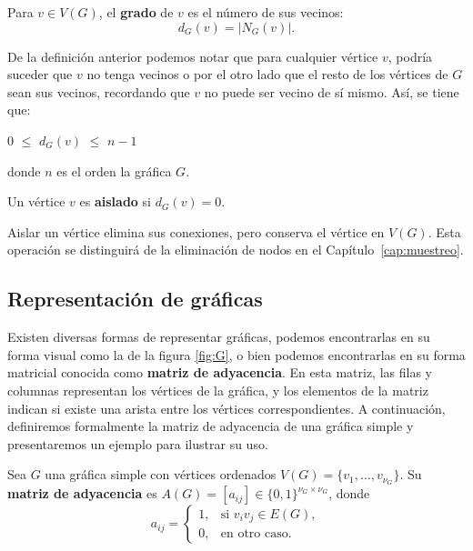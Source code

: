 \begin{definition}
\label{def:grado-vertice}
Para $v\in V(G)$, el \textbf{grado} de $v$ es el número de sus vecinos:
\[
d_G(v)=|N_G(v)|.
\]
\end{definition}

De la definición anterior podemos notar que para cualquier vértice $v$, podría suceder que $v$ no tenga vecinos o por el otro lado que el resto de los vértices de $G$ sean sus vecinos, recordando que $v$ no puede ser vecino de sí mismo. Así, se tiene que:
\begin{center}
        0 $\leq$ $d_G(v)$ $\leq$ $n-1$
    \end{center} 
    donde $n$ es el orden la gráfica $G$.

\begin{definition}
\label{def:vertice-aislado}
Un vértice $v$ es \textbf{aislado} si $d_G(v)=0$.
\end{definition}

Aislar un vértice elimina sus conexiones, pero conserva el vértice en $V(G)$. Esta operación se distinguirá de la eliminación de nodos en el Capítulo~\ref{cap:muestreo}.

\subsection{Representación de gráficas}

Existen diversas formas de representar gráficas, podemos encontrarlas en su forma visual como la de la figura \ref{fig:G}, o bien podemos encontrarlas en su forma matricial conocida como \textbf{matriz de adyacencia}. 
En esta matriz, las filas y columnas representan los vértices de la gráfica, y los elementos de la matriz indican si existe una arista entre los vértices correspondientes.
A continuación, definiremos formalmente la matriz de adyacencia de una gráfica simple y presentaremos un ejemplo para ilustrar su uso.

\begin{definition}
\label{def:matriz-adyacencia}
Sea $G$ una gráfica simple con vértices ordenados $V(G)=\{v_1,\ldots,v_{\nu_G}\}$. Su \textbf{matriz de adyacencia} es $A(G)=[a_{ij}]\in\{0,1\}^{\nu_G\times\nu_G}$, donde
\[
a_{ij}=\begin{cases}
1,&\text{si }v_iv_j\in E(G),\\
0,&\text{en otro caso.}
\end{cases}
\]
\end{definition}


